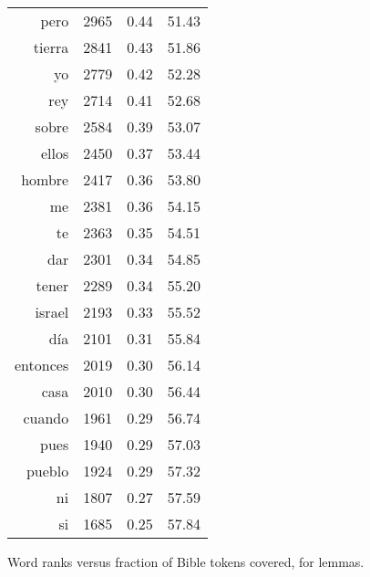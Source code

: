 \begin{figure*}
\begin{tiny}
\begin{centering}
\begin{tabular}{|r|c|c|c|}
pero & 2965 & 0.44 & 51.43 \\
tierra & 2841 & 0.43 & 51.86 \\
yo & 2779 & 0.42 & 52.28 \\
rey & 2714 & 0.41 & 52.68 \\
sobre & 2584 & 0.39 & 53.07 \\
ellos & 2450 & 0.37 & 53.44 \\
hombre & 2417 & 0.36 & 53.80 \\
me & 2381 & 0.36 & 54.15 \\
te & 2363 & 0.35 & 54.51 \\
dar & 2301 & 0.34 & 54.85 \\
tener & 2289 & 0.34 & 55.20 \\
israel & 2193 & 0.33 & 55.52 \\
día & 2101 & 0.31 & 55.84 \\
entonces & 2019 & 0.30 & 56.14 \\
casa & 2010 & 0.30 & 56.44 \\
cuando & 1961 & 0.29 & 56.74 \\
pues & 1940 & 0.29 & 57.03 \\
pueblo & 1924 & 0.29 & 57.32 \\
ni & 1807 & 0.27 & 57.59 \\
si & 1685 & 0.25 & 57.84 \\
\hline
\end{tabular}
\end{centering}
\end{tiny}

  \caption{Word ranks versus fraction of Bible tokens covered, for lemmas.}
  \label{fig:mostcommon-lemmas}
\end{figure*}


